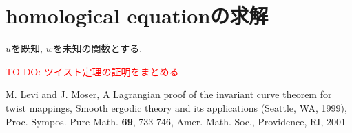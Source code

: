 \documentclass[a4paper]{ujarticle}
\newcommand{\red}[1]{\textcolor{red}{#1}} %
\numberwithin{equation}{section}
\theoremstyle{definition}
\begin{document}
        \section{homological equationの求解}
        $u$を既知, $w$を未知の関数とする.

        \red{TO DO: ツイスト定理の証明をまとめる}
    \begin{thebibliography}{10}
    \nocite{*}
	  M. Levi and J. Moser, A Lagrangian proof of the invariant curve theorem for twist mappings, 
    Smooth ergodic theory and its applications (Seattle, WA, 1999), Proc. Sympos. Pure Math. \textbf{69}, 733-746, Amer. Math. Soc., Providence, RI, 2001 
\end{thebibliography}
\end{document}

